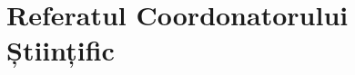 \chapter*{Referatul Coordonatorului Științific}

\thispagestyle{front}
\pagestyle{front}





\newpage